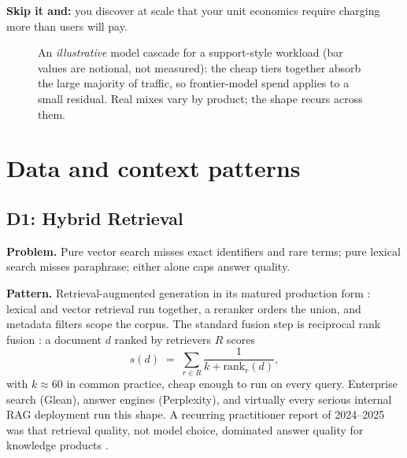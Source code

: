 \documentclass[11pt]{article}
\begin{document}
\textbf{Skip it and:} you discover at scale that your unit economics require
charging more than users will pay.

\begin{figure}[tbp]
\centering
{}
\caption{An \emph{illustrative} model cascade for a support-style workload
(bar values are notional, not measured): the cheap tiers together absorb the
large majority of traffic, so frontier-model spend applies to a small
residual. Real mixes vary by product; the shape recurs across them.}
\label{fig:cascade}
\end{figure}

\section{Data and context patterns}
\label{sec:data}

\subsection{D1: Hybrid Retrieval}

\textbf{Problem.} Pure vector search misses exact identifiers and rare terms;
pure lexical search misses paraphrase; either alone caps answer quality.

\textbf{Pattern.} Retrieval-augmented generation \citep{lewis2020rag} in its
matured production form \citep{gao2023ragsurvey}: lexical and vector retrieval
run together, a reranker orders the union, and metadata filters scope the
corpus. The standard fusion step is reciprocal rank fusion
\citep{cormack2009rrf}: a document $d$ ranked by retrievers $R$ scores
\begin{equation}
s(d) \;=\; \sum_{r \in R} \frac{1}{k + \mathrm{rank}_r(d)},
\label{eq:rrf}
\end{equation}
with $k \approx 60$ in common practice, cheap enough to run on every query. Enterprise search (Glean), answer engines (Perplexity), and virtually
every serious internal RAG deployment run this shape. A recurring
practitioner report of 2024--2025 was that retrieval quality, not model
choice, dominated answer quality for knowledge products
\citep{langchain2024state, menlo2025enterprise}.
\end{document}
